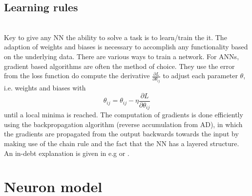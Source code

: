  \subsection{Learning rules}
 \\

 Key to give any \ac{NN} the ability to solve a task is to learn/train the it. The adaption of weights and biases is necessary to accomplish any functionality based on the underlying data\cite{zheng_introductory_2022}. There are various ways to train a network. For \acp{ANN}, gradient based algorithms are often the method of choice. They use the error from the loss function do compute the derivative $\frac{\partial L}{\partial \theta_{ij}}$ to adjust each parameter $\theta$, i.e. weights and biases with
 \begin{equation}
 	\theta_{ij} = \theta_{ij} - \eta \frac{\partial L}{\partial \theta_{ij}}
 \end{equation}
 until a local minima is reached. The computation of gradients is done efficiently using the backpropagation algorithm (reverse accumulation from \ac{AD}), in which the gradients are propagated from the output backwards towards the input by making use of the chain rule and the fact that the \ac{NN} has a layered structure. An in-debt explanation is given in e.g \cite{goodfellow_deep_2016} or \cite{nielsen_neural_2015}.





\section{Neuron model}

